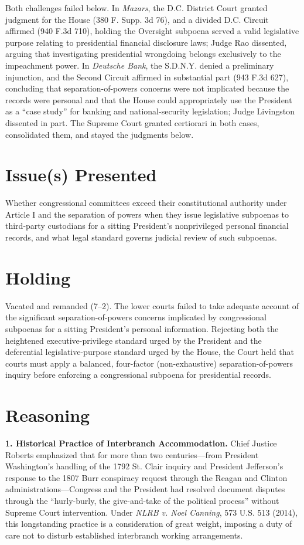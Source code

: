 \documentclass[12pt]{article}
\begin{document}
Both challenges failed below. In \textit{Mazars}, the D.C. District Court granted judgment for the House (380 F. Supp. 3d 76), and a divided D.C. Circuit affirmed (940 F.3d 710), holding the Oversight subpoena served a valid legislative purpose relating to presidential financial disclosure laws; Judge Rao dissented, arguing that investigating presidential wrongdoing belongs exclusively to the impeachment power. In \textit{Deutsche Bank}, the S.D.N.Y. denied a preliminary injunction, and the Second Circuit affirmed in substantial part (943 F.3d 627), concluding that separation-of-powers concerns were not implicated because the records were personal and that the House could appropriately use the President as a ``case study'' for banking and national-security legislation; Judge Livingston dissented in part. The Supreme Court granted certiorari in both cases, consolidated them, and stayed the judgments below.

\section{Issue(s) Presented}
Whether congressional committees exceed their constitutional authority under Article I and the separation of powers when they issue legislative subpoenas to third-party custodians for a sitting President's nonprivileged personal financial records, and what legal standard governs judicial review of such subpoenas.

\section{Holding}
Vacated and remanded (7--2). The lower courts failed to take adequate account of the significant separation-of-powers concerns implicated by congressional subpoenas for a sitting President's personal information. Rejecting both the heightened executive-privilege standard urged by the President and the deferential legislative-purpose standard urged by the House, the Court held that courts must apply a balanced, four-factor (non-exhaustive) separation-of-powers inquiry before enforcing a congressional subpoena for presidential records.

\section{Reasoning}
\textbf{1. Historical Practice of Interbranch Accommodation.} Chief Justice Roberts emphasized that for more than two centuries---from President Washington's handling of the 1792 St. Clair inquiry and President Jefferson's response to the 1807 Burr conspiracy request through the Reagan and Clinton administrations---Congress and the President had resolved document disputes through the ``hurly-burly, the give-and-take of the political process'' without Supreme Court intervention. Under \textit{NLRB v. Noel Canning}, 573 U.S. 513 (2014), this longstanding practice is a consideration of great weight, imposing a duty of care not to disturb established interbranch working arrangements.
\end{document}
